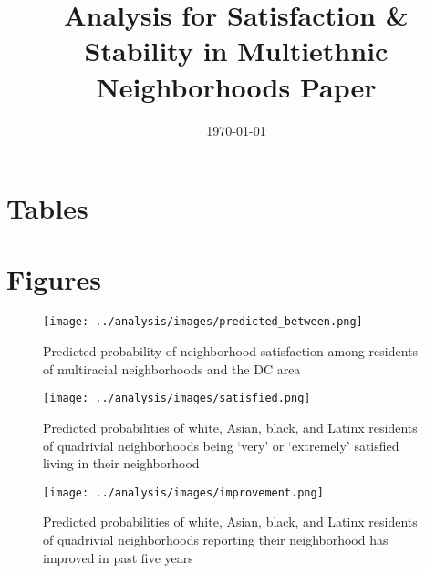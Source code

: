 \documentclass[]{baderart}
\title{Analysis for Satisfaction \& Stability in Multiethnic Neighborhoods Paper}
\date{\today}
\begin{document}
\maketitle

\section{Tables}















\clearpage
\section{Figures}

\begin{figure}[h!]
\begin{minipage}{\textwidth}
\centering
\caption{Predicted probability of neighborhood satisfaction among residents of multiracial neighborhoods and the DC area}
\texttt{[image: ../analysis/images/predicted\_between.png]}
\end{minipage}
\end{figure}

\begin{figure}[h!]
\centering
\caption{Predicted probabilities of white, Asian, black, and Latinx residents of quadrivial neighborhoods being `very' or `extremely' satisfied living in their neighborhood}
\texttt{[image: ../analysis/images/satisfied.png]}
\end{figure}

\begin{figure}[h!]
\centering
\caption{Predicted probabilities of white, Asian, black, and Latinx residents of quadrivial neighborhoods reporting their neighborhood has improved in past five years}
\texttt{[image: ../analysis/images/improvement.png]}
\end{figure}
\end{document}
